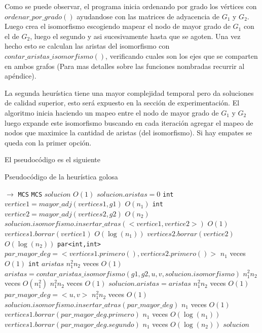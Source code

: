 Como se puede observar, el programa inicia ordenando por grado los vértices con $ordenar\_por\_grado()$ ayudandose con las matrices de adyacencia de $G_1$ y $G_2$. Luego crea el isomorfismo escogiendo mapear el nodo de mayor grado de $G_1$ con el de $G_2$, luego el segundo y asi sucesivamente hasta que se agoten. Una vez hecho esto se calculan las aristas del isomorfismo con $contar\_aristas\_isomorfismo()$, verificando cuales son los ejes que se comparten en ambos grafos (Para mas detalles sobre las funciones nombradas recurrir al apéndice).

La segunda heurística tiene una mayor complejidad temporal pero da soluciones de calidad superior, esto será expuesto en la sección de experimentación. El algoritmo inicia haciendo un mapeo entre el nodo de mayor grado de $G_1$ y $G_2$ luego expande este isomorfismo buscando en cada iteración agregar el mapeo de nodos que maximice la cantidad de aristas (del isomorfismo). Si hay empates se queda con la primer opción.

El pseudocódigo es el siguiente

\begin{algorithm}[H]
  \begin{algorithmic}[1]
  \caption{Pseudocódigo de la heurística golosa}
  \label{algo:4-1}
     $\to$ \texttt{MCS}
      \State \texttt{MCS} $solucion$ 
        \Comment $O(1)$ 
      \State $solucion.aristas = 0$ 
      \State \texttt{int} $vertice1 = mayor\_adj(vertices1,g1)$ 
      \Comment $O(n_1)$ 
      \State \texttt{int} $vertice2 = mayor\_adj(vertices2,g2)$ 
      \Comment $O(n_2)$ 
      \State $solucion.isomorfismo.insertar\_atras(<vertice1,vertice2>)$
      \Comment $O(1)$
      \State $vertices1.borrar(vertice1)$ 
      \Comment $O(\log(n_1))$ 
      \State $vertices2.borrar(vertice2)$ 
      \Comment $O(\log(n_2))$
	  \State \texttt{par<int,int>}  $par\_mayor\_deg = <vertices1.primero(),vertices2.primero()>$ 
    \Comment $n_1$ veces $O(1)$
	  \State \texttt{int} $aristas$
    \Comment $n_1^2n_2$ veces $O(1)$
	  \State $ aristas = contar\_aristas\_isomorfismo(g1,g2,u,v, solucion.isomorfismo)$
    \Comment $n_1^2n_2$ veces $O(n_1^2)$
      \Comment $n_1^2n_2$ veces $O(1)$
      \State $solucion.aristas = aristas$
      \Comment $n_1^2n_2$ veces $O(1)$
      \State $par\_mayor\_deg = <u,v>$
      \Comment $n_1^2n_2$ veces $O(1)$
      \EndIf
	  \EndFor
	  \EndFor	 
	  \State  $solucion.isomorfismo.insertar\_atras(par\_mayor\_deg)$
      \Comment $n_1$ veces $O(1)$
	  \State $ vertices1.borrar(par\_mayor\_deg.primero)$
      \Comment $n_1$ veces $O(\log(n_1))$
	  \State $ vertices1.borrar(par\_mayor\_deg.segundo)$
      \Comment $n_1$ veces $O(\log(n_2))$
	  \EndWhile      
        \State \Return $solucion$
      \EndProcedure
	\end{algorithmic}
\end{algorithm}

